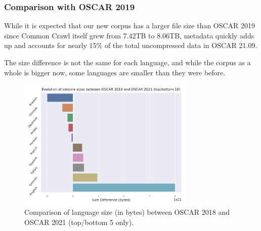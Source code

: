 \subsubsection{Comparison with OSCAR 2019}

While it is expected that our new corpus has a larger file size than OSCAR 2019 since Common Crawl itself grew from 7.42TB to 8.06TB, metadata quickly adds up and accounts for nearly 15\% of the total uncompressed data in OSCAR 21.09.

\begin{table}[t]
    \centering\small
    \caption{Comparison of the size of the Common Crawl dumps and their corresponding OSCAR sizes between the 2019 and the 21.09 versions. Compressed (Common Crawl) sources are from November 2018 and February 2021 dumps. Total is Textual + Metadata without deduplication.}
    \label{tab:oscar-size}
\end{table}

The size difference is not the same for each language, and while the corpus as a whole is bigger now, some languages are smaller than they were before.

\begin{figure}[ht]
    \centering
    \includegraphics[width=0.75\textwidth, angle=0]{static/media/oscar/ungoliant/size_evo}
    \caption{Comparison of language size (in bytes) between OSCAR 2018 and OSCAR 2021 (top/bottom 5 only). }
    \label{fig:lang-size}
\end{figure}

